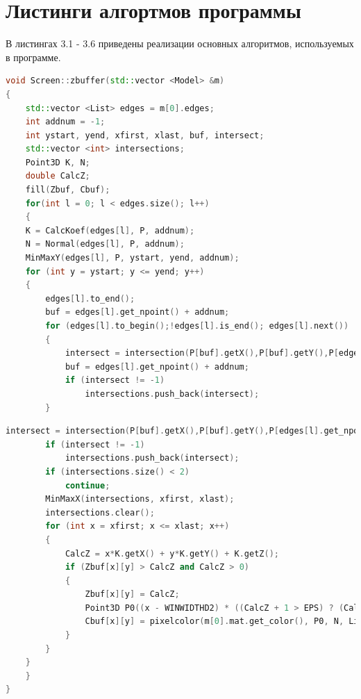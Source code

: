 \documentclass[a4paper,14pt]{report}
\begin{document}
\section{Листинги алгортмов программы}
В листингах 3.1 - 3.6 приведены реализации основных алгоритмов, используемых в программе.
\newpage
\begin{center}
\captionsetup{justification=raggedright,singlelinecheck=off}
\begin{lstlisting}[language=C++,
                   directivestyle={\color{black}}
                   emph={int,char,double,float,unsigned},
                   emphstyle={\color{blue}}, caption = Функция Z-буфера часть 1] 
void Screen::zbuffer(std::vector <Model> &m)
{
    std::vector <List> edges = m[0].edges;
    int addnum = -1;
    int ystart, yend, xfirst, xlast, buf, intersect;
    std::vector <int> intersections;
    Point3D K, N;
    double CalcZ;
    fill(Zbuf, Cbuf);
    for(int l = 0; l < edges.size(); l++)
    {
    K = CalcKoef(edges[l], P, addnum);
    N = Normal(edges[l], P, addnum);
    MinMaxY(edges[l], P, ystart, yend, addnum);
    for (int y = ystart; y <= yend; y++)
    {
        edges[l].to_end();
        buf = edges[l].get_npoint() + addnum;
        for (edges[l].to_begin();!edges[l].is_end(); edges[l].next())
        {
            intersect = intersection(P[buf].getX(),P[buf].getY(),P[edges[l].get_npoint()+addnum].getX(),P[edges[l].get_npoint()+addnum].getY(), y);
            buf = edges[l].get_npoint() + addnum;
            if (intersect != -1)
                intersections.push_back(intersect);
        }
\end{lstlisting}
\newpage
\begin{lstlisting}[language=C++,
                   directivestyle={\color{black}}
                   emph={int,char,double,float,unsigned},
                   emphstyle={\color{blue}}, caption = Функция Z-буфера часть 2] 
        intersect = intersection(P[buf].getX(),P[buf].getY(),P[edges[l].get_npoint()+addnum].getX(),P[edges[l].get_npoint()+addnum].getY(), y);
        if (intersect != -1)
            intersections.push_back(intersect);
        if (intersections.size() < 2)
            continue;
        MinMaxX(intersections, xfirst, xlast);
        intersections.clear();
        for (int x = xfirst; x <= xlast; x++)
        {
            CalcZ = x*K.getX() + y*K.getY() + K.getZ();
            if (Zbuf[x][y] > CalcZ and CalcZ > 0)
            {
                Zbuf[x][y] = CalcZ;
                Point3D P0((x - WINWIDTHD2) * ((CalcZ + 1 > EPS) ? (CalcZ + 1) : 0.001) / MKOEF, (y - WINHEIGHTD2) * ((CalcZ + 1 > EPS) ? (CalcZ + 1) : 0.001) / MKOEF, CalcZ);
                Cbuf[x][y] = pixelcolor(m[0].mat.get_color(), P0, N, Lights);
            }
        }
    }
    }
}
\end{lstlisting}
\end{center}
\end{document}
